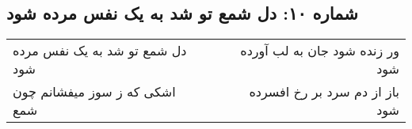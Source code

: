\begin{center}
\section*{شماره ۱۰: دل شمع تو شد به یک نفس مرده شود}
\label{sec:010}
\begin{longtable}{l p{0.5cm} r}
دل شمع تو شد به یک نفس مرده شود
&&
ور زنده شود جان به لب آورده شود
\\
اشکی که ز سوز میفشانم چون شمع
&&
باز از دم سرد بر رخ افسرده شود
\\
\end{longtable}
\end{center}
